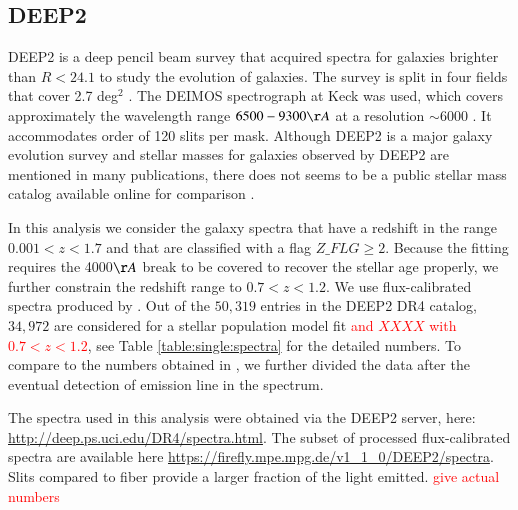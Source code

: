 \documentclass[onecolumn]{aa}
\begin{document}
\subsection{DEEP2}
DEEP2 is a deep pencil beam survey that acquired spectra for galaxies brighter than $R<24.1$ to study the evolution of galaxies. The survey is split in four fields that cover 2.7 deg$^2$  \citep{Newman_2013}. 
The DEIMOS spectrograph at Keck was used, which covers approximately the wavelength range $6500-9300\AA$ at a resolution $\sim$6000 \citep{Faber2003}. It accommodates order of 120 slits per mask. 
Although DEEP2 is a major galaxy evolution survey and stellar masses for galaxies observed by DEEP2 are mentioned in many publications, there does not seems to be a public stellar mass catalog available online for comparison \citep{kassin2007,covington2010,mostek2013,2017ApJ...838...87C}. 

In this analysis we consider the galaxy spectra that have a redshift in the range $0.001<z<1.7$ and that are classified with a flag $Z\_FLG\geq2$. 
Because the fitting requires the 4000$\AA$ break to be covered to recover the stellar age properly, we further constrain the redshift range to $0.7<z<1.2$. 
We use flux-calibrated spectra produced by \citet{Comparat2016LFs}. 
Out of the $50,319$ entries in the DEEP2 DR4 catalog, $34,972$ are considered for a stellar population model fit \textcolor{red}{and $XXXX$ with $0.7<z<1.2$}, see Table \ref{table:single:spectra} for the detailed numbers. 
To compare to the numbers obtained in \citet{Comparat2016LFs}, we further divided the data after the eventual detection of emission line in the spectrum. 


The spectra used in this analysis were obtained via the DEEP2 server, here: \url{http://deep.ps.uci.edu/DR4/spectra.html}. 
The subset of processed flux-calibrated spectra are available here \url{https://firefly.mpe.mpg.de/v1_1_0/DEEP2/spectra}. Slits compared to fiber provide a larger fraction of the light emitted. \textcolor{red}{give actual numbers}
\end{document}
